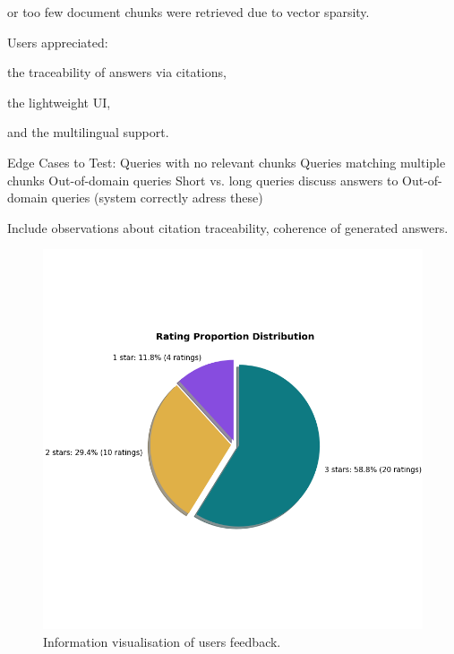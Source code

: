 \begin{spacing}{1.5}
or too few document chunks were retrieved due to vector sparsity.

Users appreciated:

the traceability of answers via citations,

the lightweight UI,

and the multilingual support.

Edge Cases to Test:
Queries with no relevant chunks
Queries matching multiple chunks
Out-of-domain queries
Short vs. long queries
discuss answers to Out-of-domain queries (system correctly adress these)

Include observations about citation traceability, coherence of generated answers.

\begin{figure}[H]
  \centering
  \includegraphics[width=\textwidth]{images/rating_proportions.png} 
  \caption{Information visualisation of users feedback.}
  \label{fig:ratings}
\end{figure}


\end{spacing}